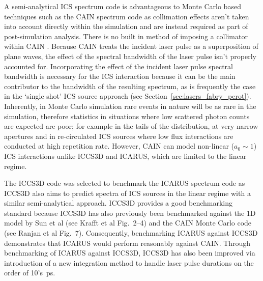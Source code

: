 \documentclass[../main.tex]{subfiles}
\begin{document}
A semi-analytical ICS spectrum code is advantageous to Monte Carlo based techniques such as the \textsc{CAIN} spectrum code as collimation effects aren't taken into account directly within the simulation and are instead required as part of post-simulation analysis. There is no built in method of imposing a collimator within \textsc{CAIN} \cite{chen1995cain}. Because \textsc{CAIN} treats the incident laser pulse as a superposition of plane waves, the effect of the spectral bandwidth of the laser pulse isn't properly accounted for. Incorporating the effect of the incident laser pulse spectral bandwidth is necessary for the ICS interaction because it can be the main contributor to the bandwidth of the resulting spectrum, as is frequently the case in the `single shot' ICS source approach (see Section~\ref{sec:lasers_fabry_perot}). Inherently, in Monte Carlo simulation rare events in nature will be as rare in the simulation, therefore statistics in situations where low scattered photon counts are expected are poor; for example in the tails of the distribution, at very narrow apertures \cite{ranjan2018simulation} and in re-circulated ICS sources where low flux interactions are conducted at high repetition rate. However, \textsc{CAIN} can model non-linear ($a_{0} \sim 1$) ICS interactions unlike \textsc{ICCS3D} and \textsc{ICARUS}, which are limited to the linear regime.  

The \textsc{ICCS3D} code \cite{krafft2016laser,ranjan2018simulation} was selected to benchmark the \textsc{ICARUS} spectrum code as \textsc{ICCS3D} also aims to predict spectra of ICS sources in the linear regime with a similar semi-analytical approach. \textsc{ICCS3D} provides a good benchmarking standard because  \textsc{ICCS3D} has also previously been benchmarked against the 1D model by Sun et al \cite{sun2009energy} (see Krafft et al \cite{krafft2016laser} Fig.~2--4) and the \textsc{CAIN} Monte Carlo code (see Ranjan et al\cite{ranjan2018simulation} Fig.~7). Consequently, benchmarking \textsc{ICARUS} against \textsc{ICCS3D} demonstrates that \textsc{ICARUS} would perform reasonably against \textsc{CAIN}. Through benchmarking of \textsc{ICARUS} against \textsc{ICCS3D}, \textsc{ICCS3D} has also been improved via introduction of a new integration method to handle laser pulse durations on the order of 10's~\si{\pico\second}.
\end{document}
